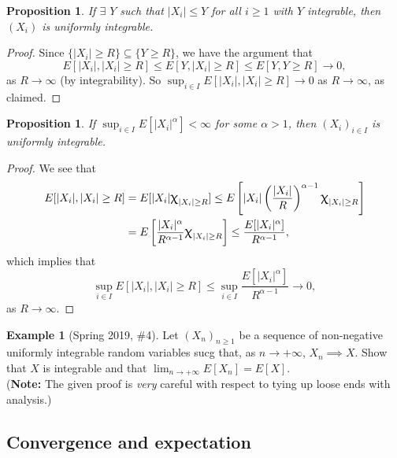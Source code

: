 \documentclass[12pt,reqno]{article}
\renewcommand{\emph}[1]{\textit{#1}}
\theoremstyle{plain}
\newtheorem{prop}[theorem]{Proposition}
\theoremstyle{definition}
\newtheorem{example}[theorem]{Example}
\renewcommand{\chi}{\scalebox{1.25}{$\upchi$}}
\begin{document}
\begin{prop} 
If $\exists$ $Y$ such that $|X_i| \leq Y$ for all $i \geq 1$ with $Y$ 
integrable, then $(X_i)$ is uniformly integrable. 
\end{prop}
\begin{proof} 
Since $\{|X_i| \geq R\} \subseteq \{Y \geq R\}$, we have the argument that 
\[
E[|X_i|, |X_i| \geq R] \leq E[Y,|X_i| \geq R] \leq 
     E[Y, Y \geq R] \longrightarrow 0, 
\]
as $R \rightarrow \infty$ (by integrability). 
So $\sup_{i \in I} E[|X_i|, |X_i| \geq R] \rightarrow 0$ as 
$R \rightarrow \infty$, as claimed. 
\end{proof} 

\begin{prop} 
If $\sup_{i \in I} E[|X_i|^{\alpha}] < \infty$ for some $\alpha > 1$, then 
$(X_i)_{i \in I}$ is uniformly integrable. 
\end{prop}
\begin{proof} 
We see that 
\begin{align*} 
E[|X_i|, |X_i| \geq R] & = E[|X_i| \chi_{|X_i| \geq R}] \leq 
     E\left[|X_i| \left(\frac{|X_i|}{R}\right)^{\alpha-1} 
     \chi_{|X_i| \geq R}\right] \\ 
     & = E\left[\frac{|X_i|^{\alpha}}{R^{\alpha-1}} 
     \chi_{|X_i| \geq R}\right] \leq 
     \frac{E[|X_i|^{\alpha}]}{R^{\alpha-1}}, 
\end{align*} 
which implies that 
\[
\sup_{i \in I} E[|X_i|, |X_i| \geq R] \leq \sup_{i \in I} 
     \frac{E[|X_i|^{\alpha}]}{R^{\alpha-1}} \longrightarrow 0, 
\]
as $R \rightarrow \infty$. 
\end{proof} 

\begin{example}[Spring 2019, \#4]
Let $(X_n)_{n \geq 1}$ be a sequence of non-negative uniformly integrable 
random variables sucg that, as $n \rightarrow +\infty$, $X_n \implies X$. 
Show that $X$ is integrable and that 
$\lim_{n \rightarrow +\infty} E[X_n] = E[X]$. \\ 
(\textbf{Note:} The given proof is \emph{very} careful with respect to tying up loose ends with analysis.) 
\end{example} 

\subsection{Convergence and expectation} 
\end{document}
